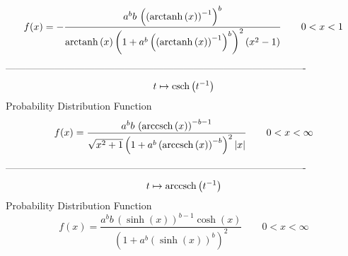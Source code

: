 \documentclass[12pt]{article}
\begin{document}
$$  f(x)=-{\frac {{a}^{b}b\, \left(  \left( {\rm arctanh} \left(x\right)
 \right) ^{-1} \right) ^{b}}{{\rm arctanh} \left(x\right) \left( 1+{a}
^{b} \left(  \left( {\rm arctanh} \left(x\right) \right) ^{-1}
 \right) ^{b} \right) ^{2} \left( {x}^{2}-1 \right) }}
 \qquad0
 < x < 1
$$-------------------------------------------------------------------------------------------  \\$$t\mapsto {\rm csch} \left({t}^{-1}\right)
$$Probability Distribution Function 
$$  f(x)={\frac {{a}^{b}b\, \left( {\rm arccsch} \left(x\right) \right) ^{-b-1}
}{\sqrt {{x}^{2}+1} \left( 1+{a}^{b} \left( {\rm arccsch} \left(x
\right) \right) ^{-b} \right) ^{2} \left| x \right| }}
 \qquad0
 < x < \infty 
$$-------------------------------------------------------------------------------------------  \\$$t\mapsto {\rm arccsch} \left({t}^{-1}\right)
$$Probability Distribution Function 
$$  f(x)={\frac {{a}^{b}b\, \left( \sinh \left( x \right)  \right) ^{b-1}\cosh
 \left( x \right) }{ \left( 1+{a}^{b} \left( \sinh \left( x \right) 
 \right) ^{b} \right) ^{2}}}
 \qquad0
 < x < \infty 
$$
\end{document}
